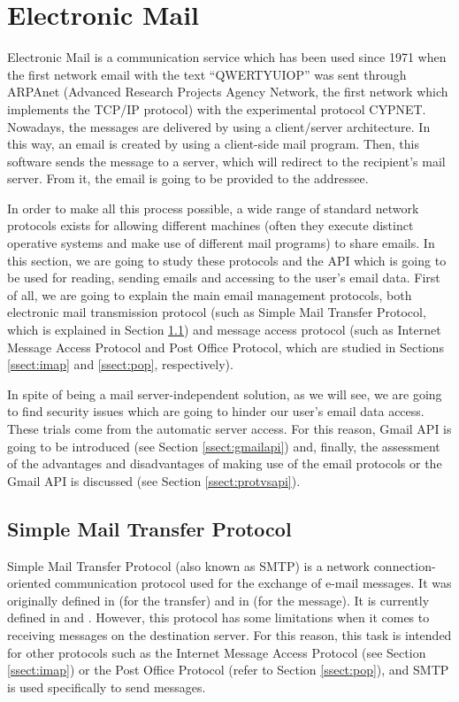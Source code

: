 \section{Electronic Mail}
Electronic Mail \citep[Chapter 11]{redhatemail} is a communication service which has been used since 1971 \citep{wikiemail} when the first network email with the text ``QWERTYUIOP'' was sent through ARPAnet (Advanced Research Projects Agency Network, the first network which implements the TCP/IP protocol) with the experimental protocol CYPNET. Nowadays, the messages are delivered by using a client/server architecture. In this way, an email is created by using a client-side mail program. Then, this software sends the message to a server, which will redirect to the recipient's mail server. From it, the email is going to be provided to the addressee.

In order to make all this process possible, a wide range of standard network protocols exists for allowing different machines (often they execute distinct operative systems and make use of different mail programs) to share emails. In this section, we are going to study these protocols and the API which is going to be used for reading, sending emails and accessing to the user's email data. First of all, we are going to explain the main email management protocols, both electronic mail transmission protocol (such as Simple Mail Transfer Protocol, which is explained in Section \ref{ssect:smtp}) and message access protocol (such as Internet Message Access Protocol and Post Office Protocol, which are studied in Sections \ref{ssect:imap} and \ref{ssect:pop}, respectively). 

In spite of being a mail server-independent solution, as we will see, we are going to find security issues which are going to hinder our user's email data access. These trials come from the automatic server access. For this reason, Gmail API is going to be introduced (see Section \ref{ssect:gmailapi}) and, finally, the assessment of the advantages and disadvantages of making use of the email protocols or the Gmail API is discussed (see Section \ref{ssect:protvsapi}).

\subsection{Simple Mail Transfer Protocol} \label{ssect:smtp}

Simple Mail Transfer Protocol (also known as SMTP) is a network connection-oriented communication protocol used for the exchange of e-mail messages. It was originally defined in \cite{rfc821} (for the transfer) and in \cite{rfc822} (for the message). It is currently defined in \cite{rfc5321} and \cite{rfc5322}. However, this protocol has some limitations when it comes to receiving messages on the destination server. For this reason, this task is intended for other protocols such as the Internet Message Access Protocol (see Section \ref{ssect:imap}) or the Post Office Protocol (refer to Section \ref{ssect:pop}), and SMTP is used specifically to send messages.

